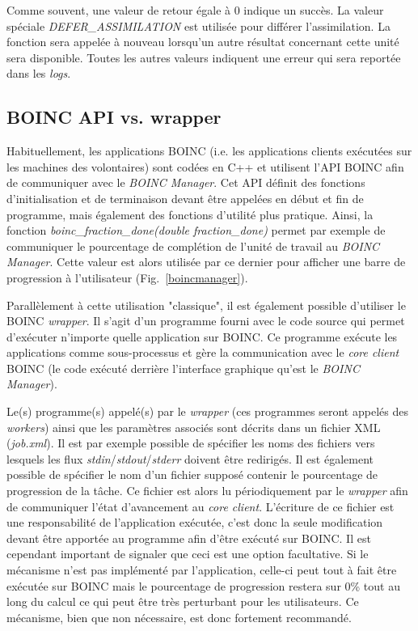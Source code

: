 \documentclass[a4paper, 12pt]{report}
\begin{document}
Comme souvent, une valeur de retour égale à 0 indique un succès. La valeur spéciale \textit{DEFER\_ASSIMILATION} est utilisée pour différer l'assimilation. La fonction sera appelée à nouveau lorsqu'un autre résultat concernant cette unité sera disponible. Toutes les autres valeurs indiquent une erreur qui sera reportée dans les \textit{logs}.


\subsection{BOINC API vs. wrapper}
Habituellement, les applications \textsc{BOINC} (i.e. les applications clients exécutées sur les machines des volontaires) sont codées en C++ et utilisent l'API \textsc{BOINC} afin de communiquer avec le \textit{BOINC Manager}. Cet API définit des fonctions d'initialisation et de terminaison devant être appelées en début et fin de programme, mais également des fonctions d'utilité plus pratique. Ainsi, la fonction \textit{boinc\_fraction\_done(\textnormal{double} fraction\_done)} permet par exemple de communiquer le pourcentage de complétion de l'unité de travail au \textit{BOINC Manager}. Cette valeur est alors utilisée par ce dernier pour afficher une barre de progression à l'utilisateur (Fig.~\ref{boincmanager}). 

Parallèlement à cette utilisation "classique", il est également possible d'utiliser le \textsc{BOINC} \textit{wrapper}. Il s'agit d'un programme fourni avec le code source qui permet d'exécuter n'importe quelle application sur \textsc{BOINC}. Ce programme exécute les applications comme sous-processus et gère la communication avec le  \textit{core client} \textsc{BOINC} (le code exécuté derrière l'interface graphique qu'est le \textit{BOINC Manager}).

Le(s) programme(s) appelé(s) par le \textit{wrapper} (ces programmes seront appelés des \textit{workers}) ainsi que les paramètres associés sont décrits dans un fichier XML (\textit{job.xml}). Il est par exemple possible de spécifier les noms des fichiers vers lesquels les flux \textit{stdin}/\textit{stdout}/\textit{stderr} doivent être redirigés. Il est également possible de spécifier le nom d'un fichier supposé contenir le pourcentage de progression de la tâche. Ce fichier est alors lu périodiquement par le \textit{wrapper} afin de communiquer l'état d'avancement au \textit{core client}. L'écriture de ce fichier est une responsabilité de l'application exécutée, c'est donc la seule modification devant être apportée au programme afin d'être exécuté sur \textsc{BOINC}. Il est cependant important de signaler que ceci est une option facultative. Si le mécanisme n'est pas implémenté par l'application, celle-ci peut tout à fait être exécutée sur \textsc{BOINC} mais le pourcentage de progression restera sur 0\% tout au long du calcul ce qui peut être très perturbant pour les utilisateurs. Ce mécanisme, bien que non nécessaire, est donc fortement recommandé.
\end{document}
